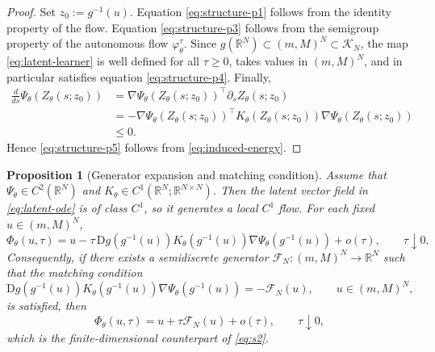 \documentclass[11pt]{article}
\newtheorem{proposition}{Proposition}
\newcommand{\R}{\mathbb{R}}
\newcommand{\cK}{\mathcal{K}}
\newcommand{\cFN}{\mathcal{F}_N}
\newcommand{\PhiT}{\Phi_{\theta}}
\begin{document}
\begin{proof}
Set \(z_0:=g^{-1}(u)\). Equation \eqref{eq:structure-p1} follows from the identity property of the flow. Equation \eqref{eq:structure-p3} follows from the semigroup property of the autonomous flow \(\varphi_{\theta}^{\tau}\). Since \(g(\R^N)\subset (m,M)^N\subset \cK_N\), the map \eqref{eq:latent-learner} is well defined for all \(\tau\ge 0\), takes values in \((m,M)^N\), and in particular satisfies equation \eqref{eq:structure-p4}. Finally,
\begin{align*}
\frac{d}{ds}\Psi_{\theta}(Z_{\theta}(s;z_0))
&=\nabla \Psi_{\theta}(Z_{\theta}(s;z_0))^\top \partial_s Z_{\theta}(s;z_0) \\
&=-\nabla \Psi_{\theta}(Z_{\theta}(s;z_0))^\top K_{\theta}(Z_{\theta}(s;z_0))\nabla \Psi_{\theta}(Z_{\theta}(s;z_0)) \\
&\le 0.
\end{align*}
Hence \eqref{eq:structure-p5} follows from \eqref{eq:induced-energy}.
\end{proof}

\begin{proposition}[Generator expansion and matching condition]\label{prop:generator}
Assume that \(\Psi_{\theta}\in C^2(\R^N)\) and \(K_{\theta}\in C^1(\R^N;\R^{N\times N})\). Then the latent vector field in \eqref{eq:latent-ode} is of class \(C^1\), so it generates a local \(C^1\) flow. For each fixed \(u\in (m,M)^N\),
\begin{equation}\label{eq:generator-expansion}
\PhiT(u,\tau)=u-\tau\,\mathrm{D}g(g^{-1}(u))K_{\theta}(g^{-1}(u))\nabla \Psi_{\theta}(g^{-1}(u))+o(\tau), \qquad \tau\downarrow 0.
\end{equation}
Consequently, if there exists a semidiscrete generator \(\cFN:(m,M)^N\to \R^N\) such that the matching condition
\begin{equation}\label{eq:matching}
\mathrm{D}g(g^{-1}(u))K_{\theta}(g^{-1}(u))\nabla \Psi_{\theta}(g^{-1}(u))=-\cFN(u), \qquad u\in (m,M)^N,
\end{equation}
is satisfied, then
\begin{equation*}
\PhiT(u,\tau)=u+\tau\cFN(u)+o(\tau), \qquad \tau\downarrow 0,
\end{equation*}
which is the finite-dimensional counterpart of \eqref{eq:s2}.
\end{proposition}
\end{document}
